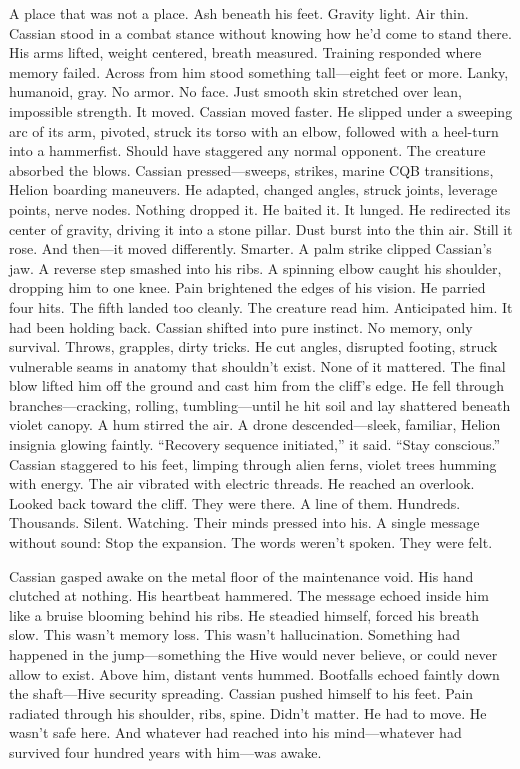 \documentclass[12pt,oneside]{book}
\begin{document}
A place that was not a place.
Ash beneath his feet. Gravity light. Air thin.
Cassian stood in a combat stance without knowing how he’d come to stand there. His arms lifted, weight centered, breath measured. Training responded where memory failed.
Across from him stood something tall—eight feet or more. Lanky, humanoid, gray. No armor. No face. Just smooth skin stretched over lean, impossible strength.
It moved.
Cassian moved faster.
He slipped under a sweeping arc of its arm, pivoted, struck its torso with an elbow, followed with a heel-turn into a hammerfist. Should have staggered any normal opponent.
The creature absorbed the blows.
Cassian pressed—sweeps, strikes, marine CQB transitions, Helion boarding maneuvers. He adapted, changed angles, struck joints, leverage points, nerve nodes.
Nothing dropped it.
He baited it. It lunged. He redirected its center of gravity, driving it into a stone pillar. Dust burst into the thin air.
Still it rose.
And then—it moved differently.
Smarter.
A palm strike clipped Cassian’s jaw. A reverse step smashed into his ribs. A spinning elbow caught his shoulder, dropping him to one knee.
Pain brightened the edges of his vision.
He parried four hits. The fifth landed too cleanly.
The creature read him.
Anticipated him.
It had been holding back.
Cassian shifted into pure instinct. No memory, only survival. Throws, grapples, dirty tricks. He cut angles, disrupted footing, struck vulnerable seams in anatomy that shouldn’t exist.
None of it mattered.
The final blow lifted him off the ground and cast him from the cliff’s edge.
He fell through branches—cracking, rolling, tumbling—until he hit soil and lay shattered beneath violet canopy.
A hum stirred the air.
A drone descended—sleek, familiar, Helion insignia glowing faintly.
“Recovery sequence initiated,” it said. “Stay conscious.”
Cassian staggered to his feet, limping through alien ferns, violet trees humming with energy. The air vibrated with electric threads.
He reached an overlook.
Looked back toward the cliff.
They were there.
A line of them.
Hundreds.
Thousands.
Silent.
Watching.
Their minds pressed into his.
A single message without sound:
Stop the expansion.
The words weren’t spoken.
They were felt.

Cassian gasped awake on the metal floor of the maintenance void.
His hand clutched at nothing.
His heartbeat hammered.
The message echoed inside him like a bruise blooming behind his ribs.
He steadied himself, forced his breath slow.
This wasn’t memory loss.
This wasn’t hallucination.
Something had happened in the jump—something the Hive would never believe, or could never allow to exist.
Above him, distant vents hummed. Bootfalls echoed faintly down the shaft—Hive security spreading.
Cassian pushed himself to his feet.
Pain radiated through his shoulder, ribs, spine.
Didn’t matter.
He had to move.
He wasn’t safe here.
And whatever had reached into his mind—whatever had survived four hundred years with him—was awake.
\end{document}
